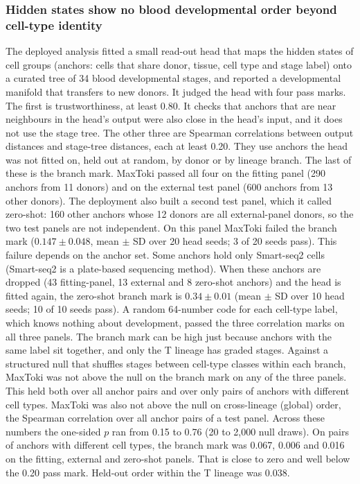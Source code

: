 \subsubsection*{Hidden states show no blood developmental order beyond cell-type identity}
The deployed analysis fitted a small read-out head that maps the hidden
states of cell groups (anchors: cells that share donor, tissue, cell type
and stage label) onto a curated tree of 34 blood developmental stages,
and reported a developmental manifold that transfers to new donors. It
judged the head with four pass marks. The first is trustworthiness, at
least 0.80. It checks that anchors that are near neighbours in the
head's output were also close in the head's input, and it does not use
the stage tree. The other three are Spearman correlations between
output distances and stage-tree distances, each at least 0.20. They use
anchors the head was not fitted on, held out at random, by donor or by
lineage branch. The last of these is the branch mark. MaxToki passed
all four on the fitting panel (290 anchors from 11
donors) and on the external test panel (600 anchors from 13 other
donors). The deployment also built a second test panel, which it called
zero-shot: 160 other anchors whose 12 donors are all external-panel
donors, so the two test panels are not independent. On this panel
MaxToki failed the branch mark ($0.147 \pm 0.048$, mean $\pm$ SD over 20
head seeds; 3 of 20 seeds pass). This failure depends on the anchor
set. Some anchors hold only Smart-seq2 cells (Smart-seq2 is a
plate-based sequencing method). When these anchors are dropped (43
fitting-panel, 13 external and 8 zero-shot anchors) and the head is
fitted again, the zero-shot branch mark is $0.34 \pm 0.01$ (mean $\pm$
SD over 10 head seeds; 10 of 10 seeds pass). A random 64-number code for
each cell-type label, which knows nothing about development, passed the three
correlation marks on all three panels. The branch mark can be high just
because anchors with the same label sit together, and only the T lineage
has graded stages. Against a structured null that shuffles stages
between cell-type classes within each branch, MaxToki was not above
the null on the branch mark on any of the three panels. This held both
over all anchor pairs and over only pairs of anchors with different
cell types. MaxToki was also not above the null on cross-lineage
(global) order, the Spearman correlation over all anchor pairs of a test
panel. Across these numbers the one-sided $p$ ran from 0.15 to 0.76 (20
to 2,000 null draws). On pairs of anchors with different cell types, the
branch mark was 0.067, 0.006 and 0.016 on the fitting, external and
zero-shot panels. That is close to zero and well below the
0.20 pass mark. Held-out order within the T lineage was 0.038.


